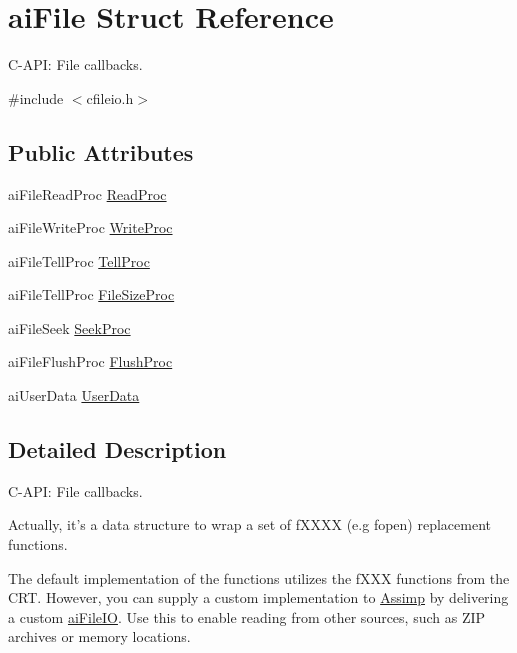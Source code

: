 \hypertarget{structai_file}{\section{ai\-File Struct Reference}
\label{structai_file}
}


C-\/\-A\-P\-I\-: File callbacks.  




{\ttfamily \#include $<$cfileio.\-h$>$}

\subsection*{Public Attributes}
\begin{DoxyCompactItemize}
\item 
ai\-File\-Read\-Proc \hyperlink{structai_file_a52287e81ca67b9d43cc1ce6142f781fa}{Read\-Proc}
\item 
ai\-File\-Write\-Proc \hyperlink{structai_file_ab9fca3a62e34a33592c13a6f31db7d1d}{Write\-Proc}
\item 
ai\-File\-Tell\-Proc \hyperlink{structai_file_aaf2d88a3b2fcbdacf51119658283d27e}{Tell\-Proc}
\item 
ai\-File\-Tell\-Proc \hyperlink{structai_file_aff2fff8c0458e7ec71f7de217c3a3033}{File\-Size\-Proc}
\item 
ai\-File\-Seek \hyperlink{structai_file_a7a07b499be4ad433669246479a4d4ad2}{Seek\-Proc}
\item 
ai\-File\-Flush\-Proc \hyperlink{structai_file_a1102d28d1c0be68ffed20476669bdb0d}{Flush\-Proc}
\item 
ai\-User\-Data \hyperlink{structai_file_aec528fa18f4755fe4f28d604fde28aad}{User\-Data}
\end{DoxyCompactItemize}


\subsection{Detailed Description}
C-\/\-A\-P\-I\-: File callbacks. 

Actually, it's a data structure to wrap a set of f\-X\-X\-X\-X (e.\-g fopen) replacement functions.

The default implementation of the functions utilizes the f\-X\-X\-X functions from the C\-R\-T. However, you can supply a custom implementation to \hyperlink{namespace_assimp}{Assimp} by delivering a custom \hyperlink{structai_file_i_o}{ai\-File\-I\-O}. Use this to enable reading from other sources, such as Z\-I\-P archives or memory locations. 

